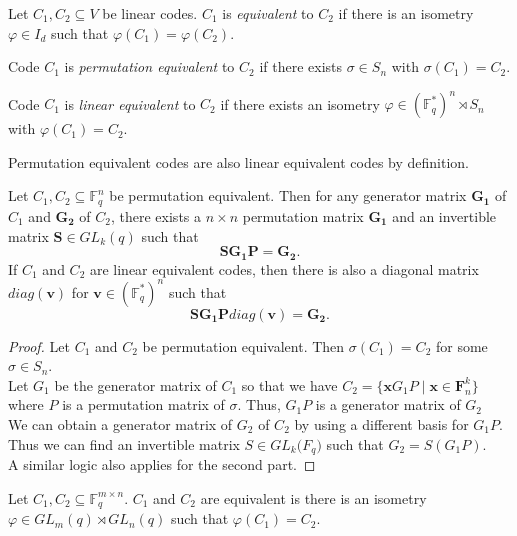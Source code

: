 \begin{definition}
Let $C_1, C_2 \subseteq V$ be linear codes. $C_1$ is \textit{equivalent} to $C_2$ if there is an isometry $\varphi \in I_d$ such that $\varphi(C_1) = \varphi(C_2)$.    
\end{definition}

\begin{definition}
Code $C_1$ is \textit{permutation equivalent} to $C_2$ if there exists $\sigma \in S_n$ with $\sigma(C_1) = C_2$.    
\end{definition}

\begin{definition}
Code $C_1$ is \textit{linear equivalent} to $C_2$ if there exists an isometry $\varphi\in (\mathbb{F}_q^*)^n \rtimes S_n$ with $\varphi(C_1) = C_2$.  
\end{definition}

Permutation equivalent codes are also linear equivalent codes by definition.

\begin{proposition}
Let $C_1, C_2 \subseteq \mathbb{F}_q^n$ be permutation equivalent. Then for any generator matrix $\mathbf{G_1}$ of $C_1$ and $\mathbf{G_2}$ of $C_2$, there exists a $n \times n$ permutation matrix $\mathbf{G_1}$ and an invertible matrix $\mathbf{S} \in GL_k(q)$ such that
\[
\mathbf{SG_1P} = \mathbf{G_2}.
\]
If $C_1$ and $C_2$ are linear equivalent codes, then there is also a diagonal matrix $diag(\mathbf{v})$ for $\mathbf{v} \in (\mathbb{F}_q^*)^n$ such that
\[
\mathbf{SG_1P}diag(\mathbf{v}) = \mathbf{G_2}.
\]
\end{proposition}

\begin{proof}
    Let $C_1$ and $C_2$ be permutation equivalent. Then $\sigma(C_1) = C_2$ for some $\sigma\in S_n$.\\Let $G_1$ be the generator matrix of $C_1$ so that we have $C_2 = \{\mathbf{x}G_1P \mid\mathbf{x}\in \mathbf{F}_n^k\}$ where $P$ is a permutation matrix of $\sigma$. Thus, $G_1P$ is a generator matrix of $G_2$\\ We can obtain a generator matrix of $G_2$ of $C_2$ by using a different basis for $G_1P$. Thus we can find an invertible matrix $S \in GL_k{\mathbb({F}_q)}$ such that $G_2 = S(G_1P)$.\\
    A similar logic also applies for the second part.
\end{proof}

\begin{definition}
Let $C_1, C_2 \subseteq \mathbb{F}_q^{m \times n}$. $C_1$ and $C_2$ are equivalent is there is an isometry $\varphi\in GL_m(q) \rtimes GL_n(q)$ such that $\varphi(C_1) = C_2$.
\end{definition}


